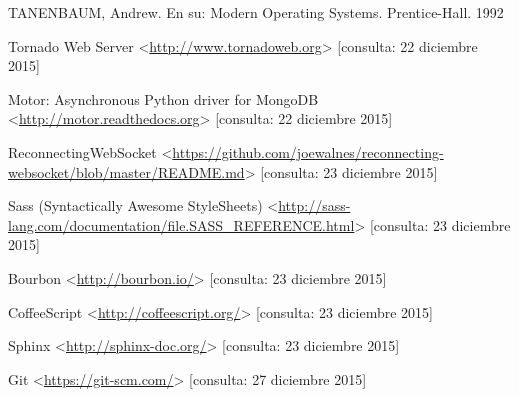 \begin{thebibliography}{9}
    TANENBAUM, Andrew.
    En su: Modern Operating Systems.
    Prentice-Hall.
    1992

    Tornado Web Server
    <\url{http://www.tornadoweb.org}>
    [consulta: 22 diciembre 2015]

    Motor: Asynchronous Python driver for MongoDB
    <\url{http://motor.readthedocs.org}>
    [consulta: 22 diciembre 2015]

    ReconnectingWebSocket
    <\url{https://github.com/joewalnes/reconnecting-websocket/blob/master/README.md}>
    [consulta: 23 diciembre 2015]

    Sass (Syntactically Awesome StyleSheets)
    <\url{http://sass-lang.com/documentation/file.SASS_REFERENCE.html}>
    [consulta: 23 diciembre 2015]

    Bourbon
    <\url{http://bourbon.io/}>
    [consulta: 23 diciembre 2015]

    CoffeeScript
    <\url{http://coffeescript.org/}>
    [consulta: 23 diciembre 2015]

    Sphinx
    <\url{http://sphinx-doc.org/}>
    [consulta: 23 diciembre 2015]

    Git
    <\url{https://git-scm.com/}>
    [consulta: 27 diciembre 2015]

\end{thebibliography}
